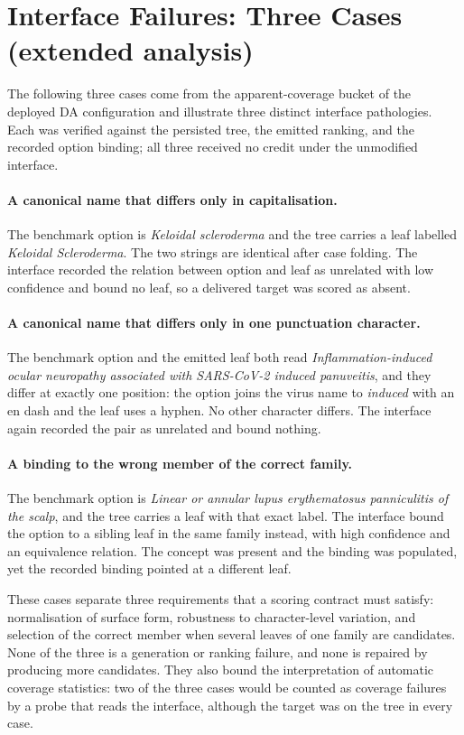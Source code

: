 \documentclass[letterpaper]{article}
\begin{document}
\section{Interface Failures: Three Cases (extended analysis)}
\label{sec:cases}

The following three cases come from the apparent-coverage bucket of the deployed DA configuration and illustrate three distinct interface pathologies.
Each was verified against the persisted tree, the emitted ranking, and the recorded option binding; all three received no credit under the unmodified interface.

\paragraph{A canonical name that differs only in capitalisation.}
The benchmark option is \emph{Keloidal scleroderma} and the tree carries a leaf labelled \emph{Keloidal Scleroderma}.
The two strings are identical after case folding.
The interface recorded the relation between option and leaf as unrelated with low confidence and bound no leaf, so a delivered target was scored as absent.

\paragraph{A canonical name that differs only in one punctuation character.}
The benchmark option and the emitted leaf both read \emph{Inflammation-induced ocular neuropathy associated with SARS-CoV-2 induced panuveitis}, and they differ at exactly one position: the option joins the virus name to \emph{induced} with an en dash and the leaf uses a hyphen.
No other character differs.
The interface again recorded the pair as unrelated and bound nothing.

\paragraph{A binding to the wrong member of the correct family.}
The benchmark option is \emph{Linear or annular lupus erythematosus panniculitis of the scalp}, and the tree carries a leaf with that exact label.
The interface bound the option to a sibling leaf in the same family instead, with high confidence and an equivalence relation.
The concept was present and the binding was populated, yet the recorded binding pointed at a different leaf.

These cases separate three requirements that a scoring contract must satisfy: normalisation of surface form, robustness to character-level variation, and selection of the correct member when several leaves of one family are candidates.
None of the three is a generation or ranking failure, and none is repaired by producing more candidates.
They also bound the interpretation of automatic coverage statistics: two of the three cases would be counted as coverage failures by a probe that reads the interface, although the target was on the tree in every case.
\end{document}
